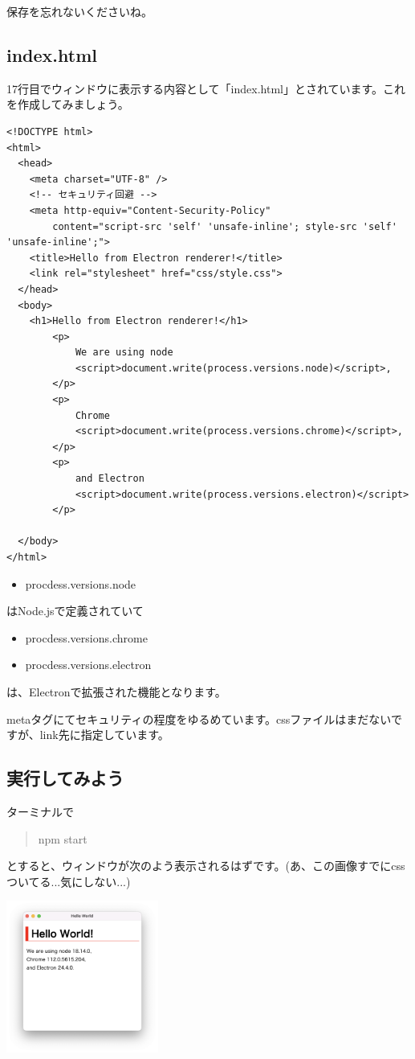 \documentclass[mingoth,11pt,a4j,uplatex]{jsarticle}
\begin{document}
保存を忘れないくださいね。

\subsection{index.html}
17行目でウィンドウに表示する内容として「index.html」とされています。これを作成してみましょう。

\begin{lstlisting}[caption=Hello World：index.html]
<!DOCTYPE html>
<html>
  <head>
    <meta charset="UTF-8" />
    <!-- セキュリティ回避 -->
    <meta http-equiv="Content-Security-Policy" 
        content="script-src 'self' 'unsafe-inline'; style-src 'self' 'unsafe-inline';">
    <title>Hello from Electron renderer!</title>
    <link rel="stylesheet" href="css/style.css">
  </head>
  <body>
    <h1>Hello from Electron renderer!</h1>
        <p>
            We are using node
            <script>document.write(process.versions.node)</script>,
        </p>
        <p>
            Chrome
            <script>document.write(process.versions.chrome)</script>,
        </p>
        <p>
            and Electron
            <script>document.write(process.versions.electron)</script>
        </p>

  </body>
</html>\end{lstlisting}

\begin{itemize}
\item procdess.versions.node
\end{itemize}
はNode.jsで定義されていて
\begin{itemize}
\item procdess.versions.chrome
\item procdess.versions.electron
\end{itemize}
は、Electronで拡張された機能となります。

metaタグにてセキュリティの程度をゆるめています。cssファイルはまだないですが、link先に指定しています。

\subsection{実行してみよう}
ターミナルで
\begin{quote}
npm start
\end{quote}
とすると、ウィンドウが次のよう表示されるはずです。(あ、この画像すでにcssついてる...気にしない...)

\includegraphics[width=5cm]{img/helloworld.png}
\end{document}
